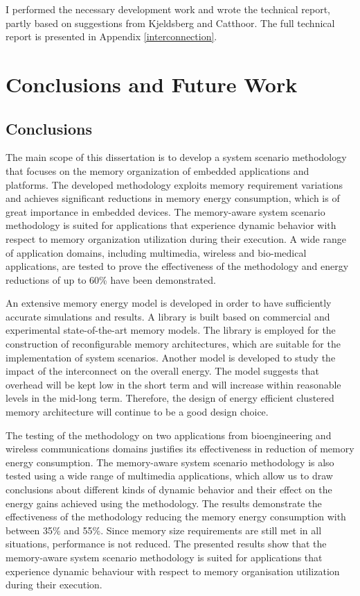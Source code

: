 I performed the necessary development work and wrote the technical report, partly based on suggestions from Kjeldsberg and Catthoor. 
The full technical report is presented in Appendix \ref{interconnection}.

\chapter{Conclusions and Future Work}
\label{conclusions}

\section{Conclusions}

The main scope of this dissertation is to develop a system scenario methodology that focuses on the memory organization of embedded applications and platforms. 
The developed methodology exploits memory requirement variations and achieves significant reductions in memory energy consumption, which is of great importance in embedded devices. 
The memory-aware system scenario methodology is suited for applications that experience dynamic behavior with respect to memory organization utilization during their execution.
A wide range of application domains, including multimedia, wireless and bio-medical applications, are tested to prove the effectiveness of the methodology and energy reductions of up to 60\% have been demonstrated.

An extensive memory energy model is developed in order to have sufficiently accurate simulations and results.
A library is built based on commercial and experimental state-of-the-art memory models.
The library is employed for the construction of reconfigurable memory architectures, which are suitable for the implementation of system scenarios.
Another model is developed to study the impact of the interconnect on the overall energy.
The model suggests that overhead will be kept low in the short term and will increase within reasonable levels in the mid-long term.
Therefore, the design of energy efficient clustered memory architecture will continue to be a good design choice.

The testing of the methodology on two applications from bioengineering and wireless communications domains justifies its effectiveness in reduction of memory energy consumption. 
The memory-aware system scenario methodology is also tested using a wide range of multimedia applications, which allow us to draw conclusions about different kinds of dynamic behavior and their effect on the energy gains achieved using the methodology. 
The results demonstrate the effectiveness of the methodology reducing the memory energy consumption with between 35\% and 55\%. 
Since memory size requirements are still met in all situations, performance is not reduced. 
The presented results show that the memory-aware system scenario methodology is suited for applications that experience dynamic behaviour with respect to memory organisation utilization during their execution.


